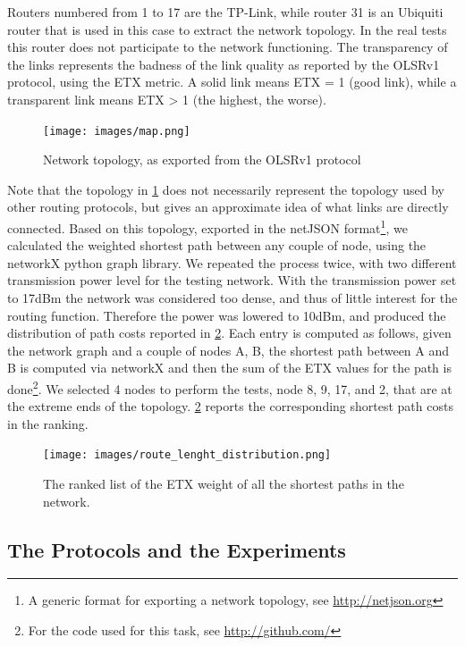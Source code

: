 \documentclass[10pt,onecolumn]{paper}
\begin{document}
Routers numbered from 1 to 17 are the TP-Link, while router 31 is an Ubiquiti
router that is used in this case to extract the network topology. In the real
tests this router does not participate to the network functioning. The
transparency of the links represents the badness of the link quality as reported
by the OLSRv1 protocol, using the ETX metric\cite{ETX}. A solid link means ETX =
1 (good link), while a transparent link means ETX > 1 (the highest, the worse).


\begin{figure}
  \centering
  \texttt{[image: images/map.png]}
  \caption{Network topology, as exported from the OLSRv1 protocol} 
  \label{fig:topo}
\end{figure}%

Note that the topology in \cref{fig:topo} does not necessarily represent the
topology used by other routing protocols, but gives an approximate idea of what
links are directly connected. Based on this topology, exported in the netJSON
format\footnote{A generic format for exporting a network topology, see
\url{http://netjson.org}}, we calculated the weighted shortest path between any couple of node,
using the networkX python graph
library. We repeated the process twice, with two different transmission power
level for the testing network. With the transmission power set to 17dBm the
network was considered too dense, and thus of little interest for the routing
function. Therefore the power was lowered to 10dBm, and produced the
distribution of path costs reported in \cref{fig:ETXrank}. Each entry is computed
as follows, given the network graph and a couple of nodes A, B, the shortest
path between A and B is computed via networkX and then the sum of the ETX values
for the path is done\footnote{For the code used for this task, see
\url{http://github.com/}}. We selected 4 nodes
to perform the tests, node 8, 9, 17, and 2, that are at the extreme ends of the
topology. \cref{fig:ETXrank} reports the corresponding shortest path costs in
the ranking.

\begin{figure}
  \centering
  \texttt{[image: images/route\_lenght\_distribution.png]}
  \caption{The ranked list of the ETX weight of all the shortest paths in the
    network.} 
  \label{fig:ETXrank}
\end{figure}

\subsection{The Protocols and the Experiments}
\end{document}

